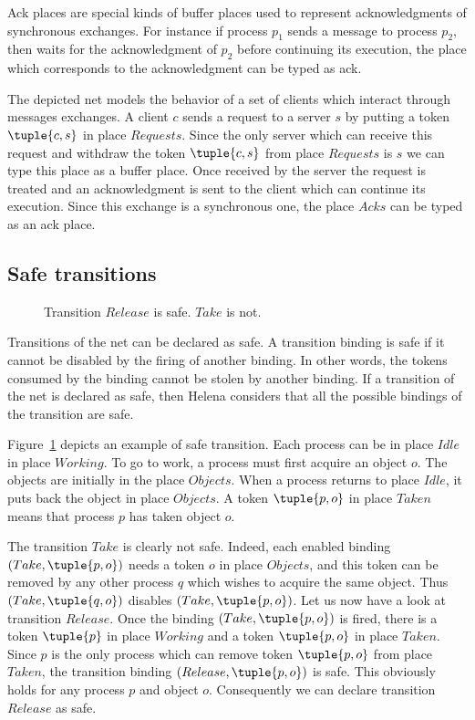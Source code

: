 Ack places are special kinds of buffer places used to represent
acknowledgments of synchronous exchanges. For instance if process
$p_1$ sends a message to process $p_2$, then waits for the
acknowledgment of $p_2$ before continuing its execution, the place
which corresponds to the acknowledgment can be typed as ack.

The depicted net models the behavior of a set of clients which
interact through messages exchanges. A client $c$ sends a request to a
server $s$ by putting a token $\tuple{c,s}$ in place $Requests$. Since
the only server which can receive this request and withdraw the token
$\tuple{c,s}$ from place $Requests$ is $s$ we can type this place as a
buffer place. Once received by the server the request is treated and
an acknowledgment is sent to the client which can continue its
execution. Since this exchange is a synchronous one, the place $Acks$
can be typed as an ack place.

\subsection{Safe transitions}

\begin{figure}[!h]
\centerline{\scalebox{0.55}{}}
\caption{Transition $Release$ is safe. $Take$ is not.}
\label{fig_safe}
\end{figure}
Transitions of the net can be declared as safe.  A transition binding
is safe if it cannot be disabled by the firing of another binding.  In
other words, the tokens consumed by the binding cannot be stolen by
another binding.  If a transition of the net is declared as safe, then
Helena considers that all the possible bindings of the transition are
safe.

Figure~\ref{fig_safe} depicts an example of safe transition.  Each
process can be in place $Idle$ in place $Working$.  To go to work, a
process must first acquire an object $o$.  The objects are initially
in the place $Objects$.  When a process returns to place $Idle$, it
puts back the object in place $Objects$.  A token $\tuple{p,o}$ in
place $Taken$ means that process $p$ has taken object $o$.

The transition $Take$ is clearly not safe.  Indeed, each enabled
binding $(Take,\tuple{p,o})$ needs a token $o$ in place $Objects$, and
this token can be removed by any other process $q$ which wishes to
acquire the same object.  Thus $(Take,\tuple{q,o})$ disables
$(Take,\tuple{p,o})$.  Let us now have a look at transition $Release$.
Once the binding $(Take,\tuple{p,o})$ is fired, there is a token
$\tuple{p}$ in place $Working$ and a token $\tuple{p,o}$ in place
$Taken$.  Since $p$ is the only process which can remove token
$\tuple{p,o}$ from place $Taken$, the transition binding
$(Release,\tuple{p,o})$ is safe.  This obviously holds for any process
$p$ and object $o$.  Consequently we can declare transition $Release$
as safe.
